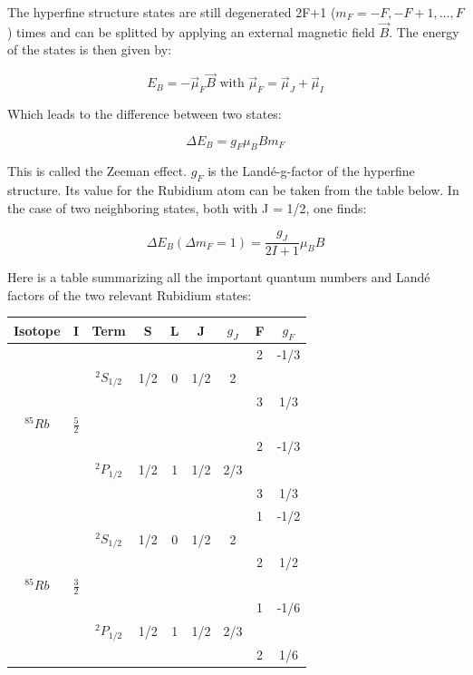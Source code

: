 The hyperfine structure states are still degenerated 2F+1 ($m_F = -F, -F+1, \dots, F$) times and can be splitted by applying an external magnetic field $\vec B$. The energy of the states is then given by:

$$E_B = -\vec\mu_F\vec B \text{\ \ \ \ \ with \ \ \ \ \ } \vec\mu_F = \vec\mu_J + \vec\mu_I$$

Which leads to the difference between two states:

$$\Delta E_B = g_F\mu_BBm_F$$

This is called the Zeeman effect. $g_F$ is the Landé-g-factor of the hyperfine structure. Its value for the Rubidium atom can be taken from the table below. In the case of two neighboring states, both with J = 1/2, one finds:

$$\Delta E _B (\Delta m_F = 1) = \frac{g_J}{2I + 1}\mu_BB$$

Here is a table summarizing all the important quantum numbers and Landé factors of the two relevant Rubidium states:

\begin{center}
\begin{tabular}[H]{| c | c | c c c c c | c c |} \hline
Isotope & I & Term & S & L & J & $g_J$ & F & $g_F$ \\ \hline \hline
 & & & & & & & 2 & -1/3 \\
 & & $^2S_{1/2}$ &1/2 & 0 & 1/2 & 2 &  & \\
 & & & & & & & 3 & 1/3 \\
$^{85}Rb$ & $\frac{5}{2}$ & & & & & & &  \\
 & & & & & & & 2 & -1/3 \\
 & & $^2P_{1/2}$ &1/2 & 1 & 1/2 & 2/3 &  & \\
 & & & & & & & 3 & 1/3 \\ \hline \hline
 
 & & & & & & & 1 & -1/2 \\
 & & $^2S_{1/2}$ &1/2 & 0 & 1/2 & 2 &  & \\
 & & & & & & & 2 & 1/2 \\ 
$^{85}Rb$ & $\frac{3}{2}$ & & & & & & & \\
 & & & & & & & 1 & -1/6 \\
 & & $^2P_{1/2}$ &1/2 & 1 & 1/2 & 2/3 &  & \\
 & & & & & & & 2 & 1/6 \\ \hline
\end{tabular}
\end{center}


